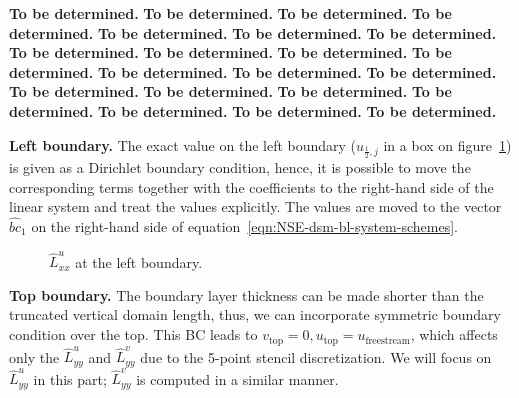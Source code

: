 \documentclass{article}
\begin{document}
\textbf{ To be determined.}\textbf{ To be determined.}\textbf{ To be determined.}\textbf{ To be determined.}\textbf{ To be determined.}\textbf{ To be determined.}\textbf{ To be determined.}\textbf{ To be determined.}\textbf{ To be determined.}\textbf{ To be determined.}\textbf{ To be determined.}\textbf{ To be determined.}\textbf{ To be determined.}\textbf{ To be determined.}\textbf{ To be determined.}\textbf{ To be determined.}\textbf{ To be determined.}\textbf{ To be determined.}\textbf{ To be determined.}\textbf{ To be determined.}\textbf{ To be determined.}


\textbf{Left boundary.} 
The exact value on the left boundary ($u_{\frac{1}{2},j}$ in a box on figure~\ref{fig:luxx-left}) is given as a Dirichlet boundary condition, hence, it is possible to move the corresponding terms together with the coefficients to the right-hand side of the linear system and treat the values explicitly. The values are moved to the vector $\hat{bc}_1$ on the right-hand side of equation~\eqref{eqn:NSE-dsm-bl-system-schemes}.
\begin{figure}[H] %
  \caption{$\hat{L}^u_{xx}$ at the left boundary.}\label{fig:luxx-left}
\end{figure}

\textbf{Top boundary.} The boundary layer thickness can be made shorter than the truncated vertical domain length, thus, we can incorporate symmetric boundary condition over the top. This BC leads to $v_{\text{top}}=0, u_{\text{top}}=u_{\text{freestream}}$, which affects only the $\hat{L}^u_{yy}$ and $\hat{L}^v_{yy}$ due to the 5-point stencil discretization. We will focus on $\hat{L}^u_{yy}$ in this part; $\hat{L}^v_{yy}$ is computed in a similar manner. 
\end{document}
